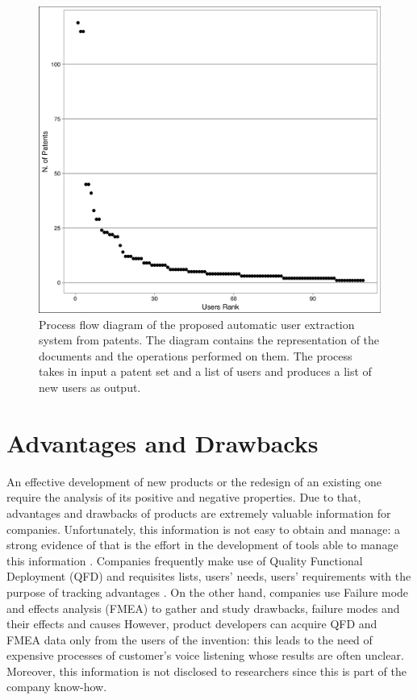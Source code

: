 \documentclass[]{book}
\begin{document}
\begin{figure}

{\centering \includegraphics[width=0.8\linewidth]{_bookdown_files/figures/user_rank} 

}

\caption{Process flow diagram of the proposed automatic user extraction system from patents. The diagram contains the representation of the documents and the operations performed on them. The process takes in input a patent set and a list of users and produces a list of new users as output.}\label{fig:patentsperuser}
\end{figure}

\section{Advantages and Drawbacks}\label{advdrwresults}

An effective development of new products or the redesign of an existing
one require the analysis of its positive and negative properties. Due to
that, advantages and drawbacks of products are extremely valuable
information for companies. Unfortunately, this information is not easy
to obtain and manage: a strong evidence of that is the effort in the
development of tools able to manage this information
\citep[\citet{ulrich2003product}]{pahl2013engineering}. Companies
frequently make use of Quality Functional Deployment (QFD) and
requisites lists, users' needs, users' requirements with the purpose of
tracking advantages \citep{carnevalli2008review}. On the other hand,
companies use Failure mode and effects analysis (FMEA) to gather and
study drawbacks, failure modes and their effects and causes
\citep{liu2013risk} However, product developers can acquire QFD and FMEA
data only from the users of the invention: this leads to the need of
expensive processes of customer's voice listening whose results are
often unclear. Moreover, this information is not disclosed to
researchers since this is part of the company know-how.
\end{document}
